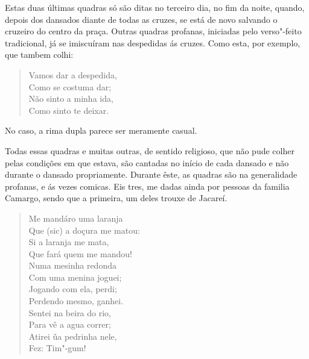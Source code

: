 Estas duas últimas quadras só são ditas no terceiro dia, no fim da
noite, quando, depois dos dansados diante de todas as cruzes, se está de
novo salvando o cruzeiro do centro da praça. Outras quadras profanas,
iniciadas pelo verso"-feito tradicional, já se imiscuíram nas despedidas
ás cruzes. Como esta, por exemplo, que tambem colhi:

\begin{verse}
Vamos dar a despedida,\\
Como se costuma dar;\\
Não sinto a minha ida,\\
Como sinto te deixar.
\end{verse}

No caso, a rima dupla parece ser meramente casual.

Todas essas quadras e muitas outras, de sentido religioso, que não pude
colher pelas condições em que estava, são cantadas no início de cada
dansado e não durante o dansado propriamente. Durante êste, as quadras
são na generalidade profanas, e ás vezes comicas. Eis tres, me dadas
ainda por pessoas da familia Camargo, sendo que a primeira, um deles
trouxe de Jacareí.

\begin{verse}
Me mandáro uma laranja\\
Que (sic) a doçura me matou:\\
Si a laranja me mata,\\
Que fará quem me mandou!\\[5pt]
Numa mesinha redonda\\
Com uma menina joguei;\\
Jogando com ela, perdi;\\
Perdendo mesmo, ganhei.\\[5pt]
Sentei na beira do rio,\\
Para vê a agua correr;\\
Atirei ũa pedrinha nele,\\
Fez: Tim"-gum!
\end{verse}

